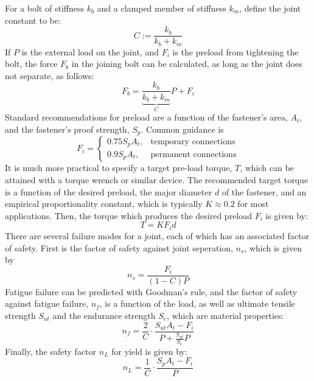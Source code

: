 For a bolt of stiffness $k_b$ and a clamped member of stiffness $k_m$, define the joint constant to be: \[C:= \frac{k_b}{k_b+k_m}\] If $P$ is the external load on the joint, and $F_i$ is the preload from tightening the bolt, the force $F_b$ in the joining bolt can be calculated, as long as the joint does not separate, as follows: \[F_b = \underbrace{\frac{k_b}{k_b+k_m}}_C P +F_i\] Standard recommendations for preload are a function of the fastener's area, $A_t$, and the fastener's proof strength, $S_p$. Common guidance is \[F_i = \begin{cases}
    0.75S_p A_t, & \text{temporary connections}\\
    0.9S_pA_t, & \text{permanent connections}
\end{cases}\] It is much more practical to specify a target pre-load torque, $T$, which can be attained with a torque wrench or similar device. The recommended target torque is a function of the desired preload, the major diameter $d$ of the fastener, and an empirical proportionality constant, which is typically $K\approx 0.2$ for most applications. Then, the torque which produces the desired preload $F_i$ is given by: \[T = KF_i d\] There are several failure modes for a joint, each of which has an associated factor of safety. First is the factor of safety against joint seperation, $n_s$, which is given by \[n_s = \frac{F_i}{(1-C)P}\tag{Safety Factor of Separation}\] Fatigue failure can be predicted with Goodman's rule, and the factor of safety against fatigue failure, $n_f$, is a function of the load, as well as ultimate tensile strength $S_{ut}$ and the endurance strength $S_e$, which are material properties: \[n_f = \frac{2}{C}\cdot \frac{S_{ut}A_t-F_i}{P+\frac{S_{ut}}{S_e}P}\tag{Safety Factor of Fatigue}\] Finally, the safety factor $n_L$ for yield is given by: \[n_L = \frac{1}{C}\cdot \frac{S_pA_t-F_i}{P}\tag{Safety Factor of Yield}\]

